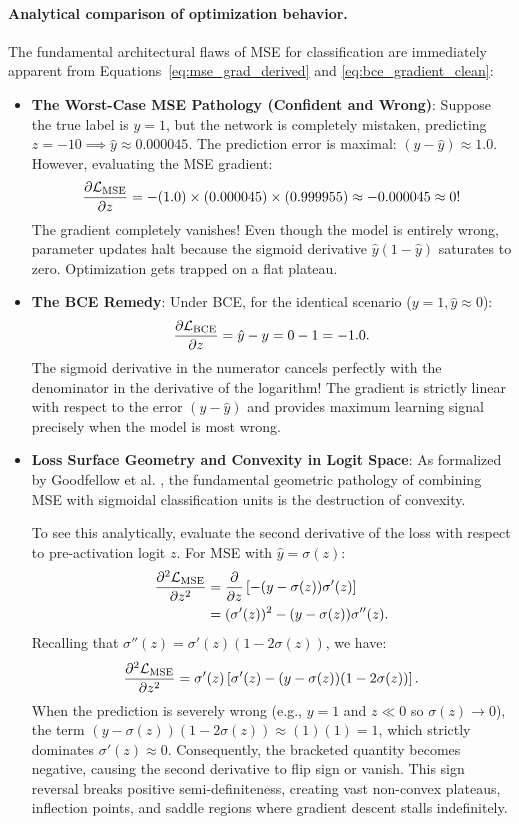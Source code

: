 \documentclass[../../main.tex]{subfiles}
\begin{document}
\paragraph{Analytical comparison of optimization behavior.}
The fundamental architectural flaws of MSE for classification are immediately apparent from Equations~\eqref{eq:mse_grad_derived} and \eqref{eq:bce_gradient_clean}:
\begin{itemize}
    \item \textbf{The Worst-Case MSE Pathology (Confident and Wrong)}:
    Suppose the true label is $y = 1$, but the network is completely mistaken, predicting $z = -10 \implies \hat{y} \approx 0.000045$.
    The prediction error is maximal: $(y - \hat{y}) \approx 1.0$. However, evaluating the MSE gradient:
    \[
    \frac{\partial \mathcal{L}_{\text{MSE}}}{\partial z} = -(1.0) \times (0.000045) \times (0.999955) \approx -0.000045 \approx 0!
    \]
    The gradient completely vanishes! Even though the model is entirely wrong, parameter updates halt because the sigmoid derivative $\hat{y}(1 - \hat{y})$ saturates to zero. Optimization gets trapped on a flat plateau.
    \item \textbf{The BCE Remedy}:
    Under BCE, for the identical scenario ($y = 1, \hat{y} \approx 0$):
    \[
    \frac{\partial \mathcal{L}_{\text{BCE}}}{\partial z} = \hat{y} - y = 0 - 1 = -1.0.
    \]
    The sigmoid derivative in the numerator cancels perfectly with the denominator in the derivative of the logarithm! The gradient is strictly linear with respect to the error $(y - \hat{y})$ and provides maximum learning signal precisely when the model is most wrong.
    \item \textbf{Loss Surface Geometry and Convexity in Logit Space}: As formalized by Goodfellow et al. \cite{goodfellow2016}, the fundamental geometric pathology of combining MSE with sigmoidal classification units is the destruction of convexity. 
    
    To see this analytically, evaluate the second derivative of the loss with respect to pre-activation logit $z$. For MSE with $\hat{y} = \sigma(z)$:
    \begin{align}
    \frac{\partial^2 \mathcal{L}_{\text{MSE}}}{\partial z^2} &= \frac{\partial}{\partial z} \left[ - (y - \sigma(z)) \sigma'(z) \right] \nonumber \\
    &= (\sigma'(z))^2 - (y - \sigma(z)) \sigma''(z).
    \end{align}
    Recalling that $\sigma''(z) = \sigma'(z)(1 - 2\sigma(z))$, we have:
    \begin{equation}
    \label{eq:mse_second_derivative}
    \frac{\partial^2 \mathcal{L}_{\text{MSE}}}{\partial z^2} = \sigma'(z) \left[ \sigma'(z) - (y - \sigma(z))(1 - 2\sigma(z)) \right].
    \end{equation}
    When the prediction is severely wrong (e.g., $y = 1$ and $z \ll 0$ so $\sigma(z) \to 0$), the term $(y - \sigma(z))(1 - 2\sigma(z)) \approx (1)(1) = 1$, which strictly dominates $\sigma'(z) \approx 0$. Consequently, the bracketed quantity becomes negative, causing the second derivative to flip sign or vanish. This sign reversal breaks positive semi-definiteness, creating vast non-convex plateaus, inflection points, and saddle regions where gradient descent stalls indefinitely.


\end{itemize}
\end{document}
